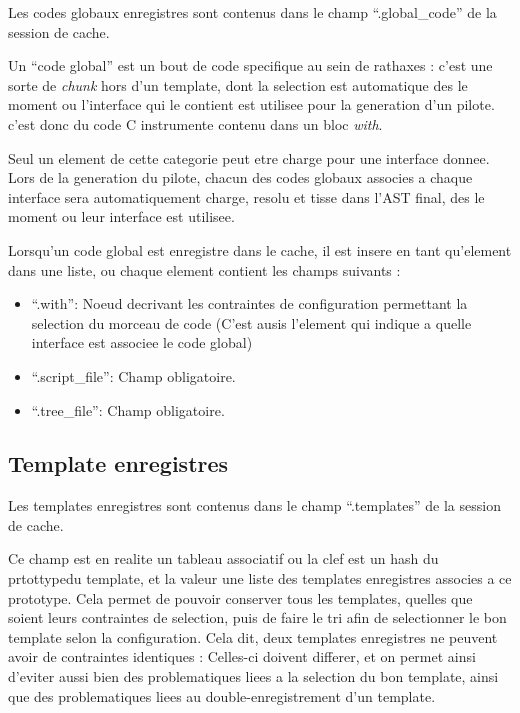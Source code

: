 \documentclass[french]{rtxreport}
\begin{document}
Les codes globaux enregistres sont contenus dans le champ ``.global\_code'' de
la session de cache.

Un ``code global'' est un bout de code specifique au sein de rathaxes : c'est
une sorte de \emph{chunk} hors d'un template, dont la selection est automatique
des le moment ou l'interface qui le contient est utilisee pour la generation
d'un pilote. c'est donc du code C instrumente contenu dans un bloc \emph{with}.

Seul un element de cette categorie peut etre charge pour une interface donnee.
Lors de la generation du pilote, chacun des codes globaux associes a chaque
interface sera automatiquement charge, resolu et tisse dans l'AST final, des le
moment ou leur interface est utilisee.

Lorsqu'un code global est enregistre dans le cache, il est insere en tant
qu'element dans une liste, ou chaque element contient les champs suivants :
\begin{itemize}
    \item ``.with'': Noeud decrivant les contraintes de configuration
        permettant la selection du morceau de code (C'est ausis l'element qui
        indique a quelle interface est associee le code global)
    \item ``.script\_file'': Champ obligatoire.
    \item ``.tree\_file'': Champ obligatoire.
\end{itemize}


\subsection{Template enregistres}

Les templates enregistres sont contenus dans le champ ``.templates'' de la
session de cache.

Ce champ est en realite un tableau associatif ou la clef est un hash du
prtottypedu template, et la valeur une liste des templates enregistres associes
a ce prototype. Cela permet de pouvoir conserver tous les templates, quelles
que soient leurs contraintes de selection, puis de faire le tri afin de
selectionner le bon template selon la configuration. Cela dit, deux templates
enregistres ne peuvent avoir de contraintes identiques : Celles-ci doivent
differer, et on permet ainsi d'eviter aussi bien des problematiques liees a la
selection du bon template, ainsi que des problematiques liees au
double-enregistrement d'un template.
\end{document}
